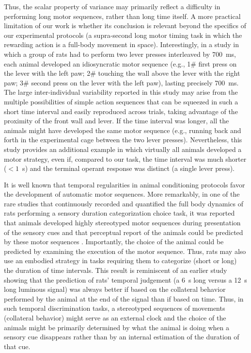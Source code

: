 Thus, the scalar property of variance may primarily reflect a difficulty in performing long motor sequences, rather than long time itself.
A more practical limitation of our work is whether its conclusion is relevant beyond the specifics of our experimental protocols (a supra-second long motor timing task in which the rewarding action is a full-body movement in space).
Interestingly, in a study in which a group of rats had to perform two lever presses interleaved by 700~ms, each animal developed an idiosyncratic motor sequence (e.g., 1\# first press on the lever with the left paw; 2\# touching the wall above the lever with the right paw; 3\# second press on the lever with the left paw), lasting precisely 700~ms\cite{Kawai2015Neuron}.
The large inter-individual variability reported in this study may arise from the multiple possibilities of simple action sequences that can be squeezed in such a short time interval and easily reproduced across trials, taking advantage of the proximity of the front wall and lever.
If the time interval was longer, all the animals might have developed the same motor sequence (e.g., running back and forth in the experimental cage between the two lever presses).
Nevertheless, this study provides an additional example in which virtually all animals developed a motor strategy, even if, compared to our task, the time interval was much shorter ($< 1$~s) and the terminal operant response was distinct (a single lever press).
\par
It is well known that temporal regularities in animal conditioning protocols favor the development of automatic motor sequences.
More remarkably, in one of the rare studies that continuously recorded and quantified the full body dynamics of rats performing a sensory duration categorization choice task, it was reported that animals developed highly stereotyped motor sequences during presentation of the sensory cues and that perceptual report of the animals could be predicted by these motor sequences \cite{Gouvea2014FrontNeurorobotics}.
Importantly, the choice of the animal could be predicted by examining the execution of the motor sequence.
Thus, rats may also use an embodied strategy in tasks requiring them to categorize (short or long) the duration of time intervals.
This result is reminiscent of an earlier study showing that the prediction of rats' temporal judgement (a 6~s long versus a 12~s long luminous signal) was always better if based on the collateral behavior performed by the animal at the end of the signal than if based on time\cite{Fetterman1998}.
Thus, in such temporal discrimination tasks, a stereotyped sequences of movements (collateral behavior) might serve as an external clock and the choice of the animals might be primarily determined by what the animal is doing when a sensory cue disappears rather than by an internal estimation of the duration of that cue.
